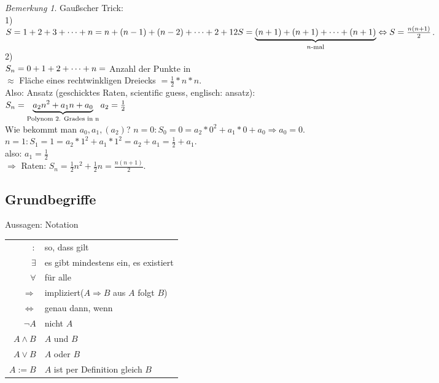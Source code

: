 \documentclass[12pt,a4paper,titlepage]{article} %
\theoremstyle{definition}
\theoremstyle{remark}
\newtheorem*{bem}{Bemerkung}
\begin{document}
\begin{bem}
	Gaußscher Trick:\\
	1)\\
	$S=1+2+3+\dots+n=n+(n-1)+(n-2)+\dots+2+1\\
	2S = \underbrace{(n+1)+(n+1)+\dots+(n+1)}_{n\text{-mal}} \Leftrightarrow S = 
	\frac{n(n+1)}{2}$.\\
	2)\\
	$S_n = 0 + 1 + 2 + \dots + n\\=$ Anzahl der Punkte in\\
	$\approx$ Fläche eines rechtwinkligen Dreiecks $=\frac{1}{2}*n*n$.\\
	Also: Ansatz (\glqq geschicktes Raten\grqq , \glqq scientific guess\grqq , englisch: ansatz):\\
	$S_n = \underbrace{a_2 n^2 + a_1 n + a_0}_{\text{Polynom 2. Grades in n}}\\
	a_2 = \frac{1}{2}$\\
	Wie bekommt man $a_0, a_1, (a_2)$?
	$n=0: S_0 = 0 = a_2*0^2+a_1*0+a_0 \Rightarrow a_0 = 0$.\\
	$n=1: S_1 = 1 = a_2*1^2+a_1*1^2 = a_2 + a_1 = \frac{1}{2} + a_1$.\\
	also: $a_1 = \frac{1}{2}$\\
	$\Rightarrow$ Raten: $S_n = \frac{1}{2}n^2 + \frac{1}{2} n = \frac{n(n+1)}{2}$.
\end{bem}

\subsection{Grundbegriffe}
Aussagen: Notation\\
\begin{tabular}{r|l}
	$:$ & \glqq so, dass gilt\grqq\\
	$\exists$ & \glqq es gibt mindestens ein\grqq , \glqq es existiert\grqq\\
	$\forall$ & \glqq für alle\grqq\\
	$\Rightarrow$ & \glqq impliziert\grqq($A \Rightarrow B$ \glqq aus $A$ folgt $B$\grqq)\\
	$\Leftrightarrow$ & \glqq genau dann, wenn\grqq\\
	$\neg A$ & nicht $A$\\
	$A \wedge B$ & $A$ und $B$\\
	$A \vee B$ & $A$ oder $B$\\
	$A := B$ & $A$ ist per Definition gleich $B$
\end{tabular}
\end{document}
